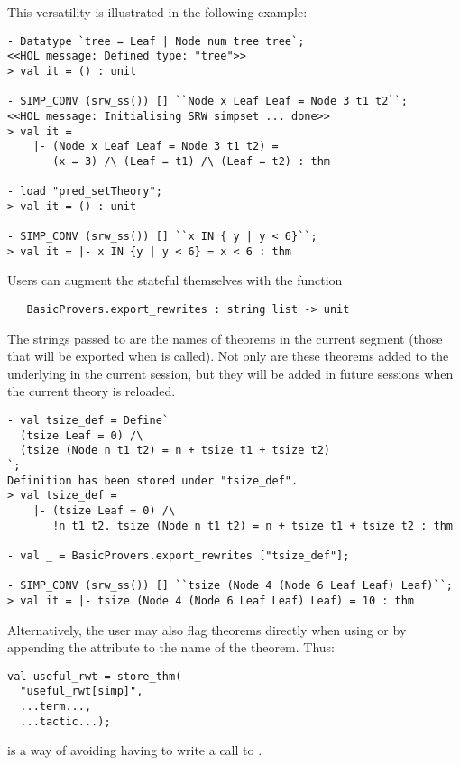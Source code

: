 This versatility is illustrated in the following example:
\begin{session}
\begin{verbatim}
- Datatype `tree = Leaf | Node num tree tree`;
<<HOL message: Defined type: "tree">>
> val it = () : unit

- SIMP_CONV (srw_ss()) [] ``Node x Leaf Leaf = Node 3 t1 t2``;
<<HOL message: Initialising SRW simpset ... done>>
> val it =
    |- (Node x Leaf Leaf = Node 3 t1 t2) =
       (x = 3) /\ (Leaf = t1) /\ (Leaf = t2) : thm

- load "pred_setTheory";
> val it = () : unit

- SIMP_CONV (srw_ss()) [] ``x IN { y | y < 6}``;
> val it = |- x IN {y | y < 6} = x < 6 : thm
\end{verbatim}
\end{session}
%
Users can augment the stateful \simpset{} themselves with the function
%
\begin{holboxed}
\begin{verbatim}
   BasicProvers.export_rewrites : string list -> unit
\end{verbatim}
\end{holboxed}
The strings passed to  are the names of theorems
in the current segment (those that will be exported when
 is called).  Not only are these theorems added to
the underlying \simpset{} in the current session, but they will be
added in future sessions when the current theory is reloaded.
\begin{session}
\begin{verbatim}
- val tsize_def = Define`
  (tsize Leaf = 0) /\
  (tsize (Node n t1 t2) = n + tsize t1 + tsize t2)
`;
Definition has been stored under "tsize_def".
> val tsize_def =
    |- (tsize Leaf = 0) /\
       !n t1 t2. tsize (Node n t1 t2) = n + tsize t1 + tsize t2 : thm

- val _ = BasicProvers.export_rewrites ["tsize_def"];

- SIMP_CONV (srw_ss()) [] ``tsize (Node 4 (Node 6 Leaf Leaf) Leaf)``;
> val it = |- tsize (Node 4 (Node 6 Leaf Leaf) Leaf) = 10 : thm
\end{verbatim}
\end{session}

Alternatively, the user may also flag theorems directly when using  or  by appending the  attribute to the name of the theorem.
Thus:
\begin{session}
\begin{verbatim}
val useful_rwt = store_thm(
  "useful_rwt[simp]",
  ...term...,
  ...tactic...);
\end{verbatim}
\end{session}
is a way of avoiding having to write a call to .

